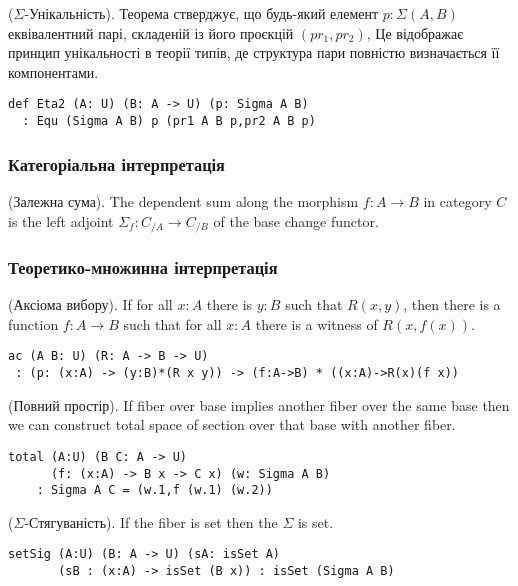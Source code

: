 \begin{theorem} ($\Sigma$-Унікальність).
Теорема стверджує, що будь-який елемент $p:\Sigma(A,B)$ еквівалентний парі, складеній із його проєкцій $(pr_1,pr_2)$,
Це відображає принцип унікальності в теорії типів, де структура пари повністю визначається її компонентами.

\begin{lstlisting}
def Eta2 (A: U) (B: A -> U) (p: Sigma A B)
  : Equ (Sigma A B) p (pr1 A B p,pr2 A B p)
\end{lstlisting}
\end{theorem}

\subsubsection{Категоріальна інтерпретація}

\begin{definition} (Залежна сума).
The dependent sum along the morphism $f: A \rightarrow B$ in category $C$ is the left
adjoint $\Sigma_f : C_{/A} \rightarrow C_{/B}$ of the base change functor.
\end{definition}

\subsubsection{Теоретико-множинна інтерпретація}

\begin{theorem} (Аксіома вибору).
If for all $x : A$ there is $y : B$ such that $R(x,y)$,
then there is a function $f : A \rightarrow B$
such that for all $x : A$ there is a witness of $R(x,f(x))$.
\begin{lstlisting}
ac (A B: U) (R: A -> B -> U)
 : (p: (x:A) -> (y:B)*(R x y)) -> (f:A->B) * ((x:A)->R(x)(f x))
\end{lstlisting}
\end{theorem}

\begin{theorem} (Повний простір).
If fiber over base implies another fiber
over the same base then we can construct total space of section
over that base with another fiber.
\begin{lstlisting}
total (A:U) (B C: A -> U)
      (f: (x:A) -> B x -> C x) (w: Sigma A B)
    : Sigma A C = (w.1,f (w.1) (w.2))
\end{lstlisting}
\end{theorem}

\begin{theorem} ($\Sigma$-Стягуваність). If the fiber is set then the $\Sigma$ is set.
\begin{lstlisting}
setSig (A:U) (B: A -> U) (sA: isSet A)
       (sB : (x:A) -> isSet (B x)) : isSet (Sigma A B)
\end{lstlisting}
\end{theorem}

